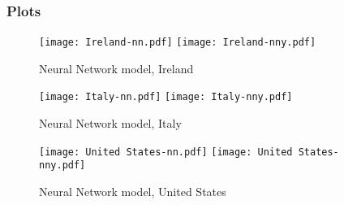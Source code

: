 \subsubsection{Plots}

\begin{figure}[H]
  \texttt{[image: Ireland-nn.pdf]} \label{fig:ireland-nn}
\endminipage\hfill
{}
  \texttt{[image: Ireland-nny.pdf]} \label{fig:ireland-nny}
\endminipage
\caption{Neural Network model, Ireland}
\end{figure}

\begin{figure}[H]
  \texttt{[image: Italy-nn.pdf]} \label{fig:italy-nn}
\endminipage\hfill
{}
  \texttt{[image: Italy-nny.pdf]} \label{fig:italy-nny}
\endminipage
\caption{Neural Network model, Italy}
\end{figure}

\begin{figure}[H]
  \texttt{[image: United States-nn.pdf]} \label{fig:usa-nn}
\endminipage\hfill
{}
  \texttt{[image: United States-nny.pdf]} \label{fig:usa-nny}
\endminipage
\caption{Neural Network model, United States}
\end{figure}
